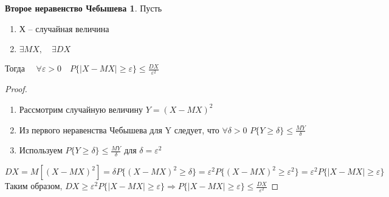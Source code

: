 \documentclass[a4paper, 12pt]{article}
\theoremstyle{definition}
\theoremstyle{leads}
\theoremstyle{example}
\begin{document}
\newtheorem*{cheb2}{Второе неравенство Чебышева}
\begin{cheb2}
	 Пусть
	\begin{enumerate}
		\item Х -- случайная величина
		\item $\exists MX, \quad \exists DX$
	\end{enumerate}
Тогда $\quad \forall \varepsilon > 0 \quad P\{|X - MX| \geq \varepsilon\} \leq \frac{DX}{\varepsilon^2}$
\end{cheb2}
\begin{proof}
	\begin{enumerate}
		\item Рассмотрим случайную величину $Y = (X - MX)^2$
		\item Из первого неравенства Чебышева для  Y следует, что $\forall \delta > 0$ $P \{ Y \geq \delta\} \leq \frac{MY}{\delta}$
		\item Используем $P \{ Y \geq \delta\} \leq \frac{MY}{\delta}$ для $\delta = \varepsilon^2$
	\end{enumerate}
	\begin{displaymath}
		DX = M[(X - MX)^2] = \delta P\{(X - MX)^2 \geq \delta\} = \varepsilon^2 P\{(X - MX)^2 \geq \varepsilon^2\} = \varepsilon^2 P\{|X - MX| \geq \varepsilon\}
	\end{displaymath}
	Таким образом, $DX \geq \varepsilon^2 P\{|X - MX| \geq \varepsilon\} \Longrightarrow P\{|X - MX|\geq \varepsilon\} \leq \frac{DX}{\varepsilon^2}$
\end{proof}
\end{document}
